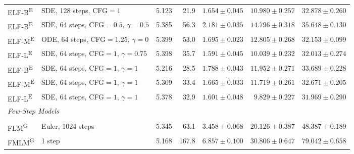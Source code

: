 \begin{table}[h]
{\begin{tabular}{@{}llrrrrr@{}}
      \rowcolor{gray!10}
      ELF-B\textsuperscript{E}
      & SDE, 128 steps, CFG$=1$ & 5.123 & 21.9
      & $1.654 \pm 0.045$
      & $10.980 \pm 0.257$
      & $32.878 \pm 0.260$ \\

      \rowcolor{gray!10}
      ELF-B\textsuperscript{E}
      & SDE, 64 steps, CFG$=0.5$, $\gamma=0.5$ & 5.385 & 56.3
      & $2.181 \pm 0.035$
      & $14.796 \pm 0.318$
      & $35.648 \pm 0.130$ \\

      \rowcolor{gray!10}
      ELF-M\textsuperscript{E}
      & ODE, 64 steps, CFG$=1.25$, $\gamma=0$ & 5.399 & 53.0
      & $1.695 \pm 0.023$
      & $12.805 \pm 0.268$
      & $32.153 \pm 0.099$ \\

      \rowcolor{gray!10}
      ELF-L\textsuperscript{E}
      & SDE, 64 steps, CFG$=1$, $\gamma=0.75$ & 5.398 & 35.7
      & $1.591 \pm 0.045$
      & $10.039 \pm 0.232$
      & $32.013 \pm 0.274$ \\

      \rowcolor{gray!10}
      ELF-B\textsuperscript{E}
      & SDE, 64 steps, CFG$=1$, $\gamma=1$ & 5.216 & 28.5
      & $1.788 \pm 0.043$
      & $11.952 \pm 0.271$
      & $33.689 \pm 0.228$ \\

      \rowcolor{gray!10}
      ELF-M\textsuperscript{E}
      & SDE, 64 steps, CFG$=1$, $\gamma=1$ & 5.309 & 33.4
      & $1.665 \pm 0.033$
      & $11.719 \pm 0.261$
      & $32.671 \pm 0.205$ \\

      \rowcolor{gray!10}
      ELF-L\textsuperscript{E}
      & SDE, 64 steps, CFG$=1$, $\gamma=1$ & 5.378 & 32.9
      & $1.601 \pm 0.048$
      & $9.829 \pm 0.227$
      & $31.969 \pm 0.290$ \\
    \midrule
      \multicolumn{7}{l}{\textit{Few-Step Models}} \\
      \addlinespace[2pt]
      \addlinespace[2pt]
      \multicolumn{7}{l}{\textit{FLM} \cite{lee2026flowmaplanguagemodels}} \\

      FLM\textsuperscript{G}
      & Euler, 1024 steps & 5.345 & 63.1
      & $3.458 \pm 0.068$
      & $20.126 \pm 0.387$
      & $48.387 \pm 0.189$ \\

      FMLM\textsuperscript{G}
      & 1 step & 5.168 & 167.8
      & $6.857 \pm 0.100$
      & $30.806 \pm 0.647$
      & $79.042 \pm 0.658$ \\


\end{tabular}}
\end{table}
